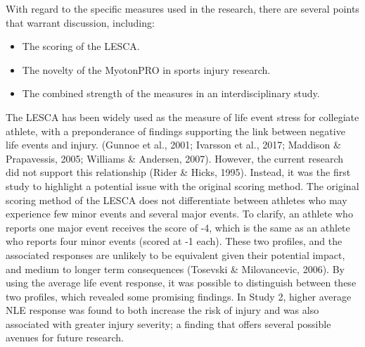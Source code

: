 \documentclass[man,floatsintext]{apa6}
\providecommand{\tightlist}{%
  \setlength{\itemsep}{0pt}\setlength{\parskip}{0pt}}
\begin{document}
With regard to the specific measures used in the research, there are several points that warrant discussion, including:

\begin{itemize}
\tightlist
\item
  The scoring of the LESCA.
\item
  The novelty of the MyotonPRO in sports injury research.
\item
  The combined strength of the measures in an interdisciplinary study.
\end{itemize}

The LESCA has been widely used as the measure of life event stress for collegiate athlete, with a preponderance of findings supporting the link between negative life events and injury.
(Gunnoe et al., 2001; Ivarsson et al., 2017; Maddison \& Prapavessis, 2005; Williams \& Andersen, 2007).
However, the current research did not support this relationship (Rider \& Hicks, 1995).
Instead, it was the first study to highlight a potential issue with the original scoring method.
The original scoring method of the LESCA does not differentiate between athletes who may experience few minor events and several major events. To clarify, an athlete who reports one major event receives the score of -4, which is the same as an athlete who reports four minor events (scored at -1 each). These two profiles, and the associated responses are unlikely to be equivalent given their potential impact, and medium to longer term consequences (Tosevski \& Milovancevic, 2006).
By using the average life event response, it was possible to distinguish between these two profiles, which revealed some promising findings.
In Study 2, higher average NLE response was found to both increase the risk of injury and was also associated with greater injury severity; a finding that offers several possible avenues for future research.
\end{document}
